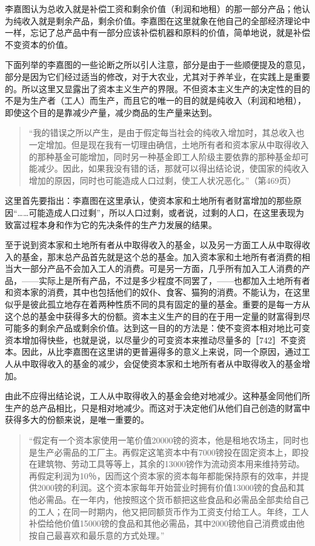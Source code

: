 李嘉图认为总收入就是补偿工资和剩余价值（利润和地租）的那一部分产品；他认为纯收入就是剩余产品，剩余价值。李嘉图在这里就象在他自己的全部经济理论中一样，忘记了总产品中有一部分应该补偿机器和原料的价值，简单地说，就是补偿不变资本的价值。


下面列举的李嘉图的一些论断之所以引人注意，部分是由于一些顺便提及的意见，部分是因为它们经过适当的修改，对于大农业，尤其对于养羊业，在实践上是重要的。所以这里又显露出了资本主义生产的界限。不但资本主义生产的决定性的目的不是为生产者（工人）而生产，而且它的唯一的目的就是纯收入（利润和地租），即使这个目的是靠减少产量，减少商品的生产量来达到。

\begin{quote}{“我的错误之所以产生，是由于假定每当社会的纯收入增加时，其总收入也一定增加。但是现在我有一切理由确信，土地所有者和资本家从中取得收入的那种基金可能增加，同时另一种基金即工人阶级主要依靠的那种基金却可能减少。因此，如果我没有错的话，那就可以得出结论说，使国家的纯收入增加的原因，同时也可能造成人口过剩，使工人状况恶化。”（第469页）}\end{quote}

这里首先要指出：李嘉图在这里承认，使资本家和土地所有者财富增加的那些原因“……可能造成人口过剩”，所以人口过剩，或者说，过剩的人口，在这里表现为致富过程本身和作为它的先决条件的生产力发展的结果。

至于说到资本家和土地所有者从中取得收入的基金，以及另一方面工人从中取得收入的基金，那末总产品首先就是这个总的基金。加入资本家和土地所有者消费的相当大一部分产品不会加入工人的消费。可是另一方面，几乎所有加入工人消费的产品，——实际上是所有产品，不过是多少程度不同罢了，——也都加入土地所有者和资本家的消费，其中也包括他们的奴仆、食客、猫狗的消费。不能认为，在这里似乎是彼此孤立地存在着两种性质不同的具有固定的量的基金。重要的是每一方从这个总的基金中获得多大的份额。资本主义生产的目的在于用一定量的财富得到尽可能多的剩余产品或剩余价值。达到这一目的的方法是：使不变资本相对地比可变资本增加得快些，也就是说，以尽量少的可变资本来推动尽量多的［742］不变资本。因此，从比李嘉图在这里讲的更普遍得多的意义上来说，同一个原因，通过工人从中取得收入的基金的减少，会促使资本家和土地所有者从中取得收入的基金增加。

由此不应得出结论说，工人从中取得收入的基金会绝对地减少。这种基金同他们所生产的总产品相比，只是相对地减少。而这对于决定他们从他们自己创造的财富中获得多大的份额来说，是唯一重要的。

\begin{quote}{“假定有一个资本家使用一笔价值20000镑的资本，他是租地农场主，同时也是生产必需品的工厂主。再假定这笔资本中有7000镑投在固定资本上，即投在建筑物、劳动工具等等上，其余的13000镑作为流动资本用来维持劳动。再假定利润为10％，因而这个资本家的资本每年都能保持原有的效率，并提供2000镑的利润。这个资本家每年开始营业时拥有价值13000镑的食品和其他必需品。在一年内，他按照这个货币额把这些食品和必需品全部卖给自己的工人；在同一时期内，他又把同额货币作为工资支付给工人。年终，工人补偿给他价值15000镑的食品和其他必需品，其中2000镑他自己消费或由他按自己最喜欢和最乐意的方式处理。”}\end{quote}

